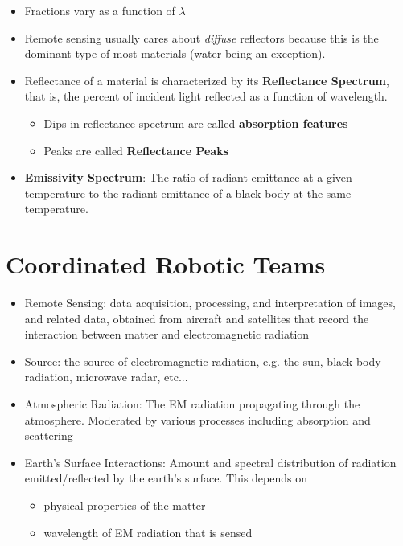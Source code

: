 \begin{itemize}
\item Fractions vary as a function of $\lambda$
\item Remote sensing usually cares about \textit{diffuse} reflectors because this is the dominant type of most materials (water being an exception).
\item Reflectance of a material is characterized by its \textbf{Reflectance Spectrum}, that is, the percent of incident light reflected as a function of wavelength.
  \begin{itemize}
  \item Dips in reflectance spectrum are called \textbf{absorption features}
  \item Peaks are called \textbf{Reflectance Peaks}
  \end{itemize}
\item \textbf{Emissivity Spectrum}: The ratio of radiant emittance at a given temperature to the radiant emittance of a black body at the same temperature.
\end{itemize}





\section{Coordinated Robotic Teams}


\begin{itemize}
\item Remote Sensing: data acquisition, processing, and interpretation of images, and related data, obtained from aircraft and satellites that record the interaction between matter and electromagnetic radiation
\item Source: the source of electromagnetic radiation, e.g. the sun, black-body radiation, microwave radar, etc...
\item Atmospheric Radiation: The EM radiation propagating through the atmosphere. Moderated by various processes including absorption and scattering
\item Earth's Surface Interactions: Amount and spectral distribution of radiation emitted/reflected by the earth's surface. This depends on
  \begin{itemize}
  \item physical properties of the matter
  \item wavelength of EM radiation that is sensed
  \end{itemize}
\end{itemize}



